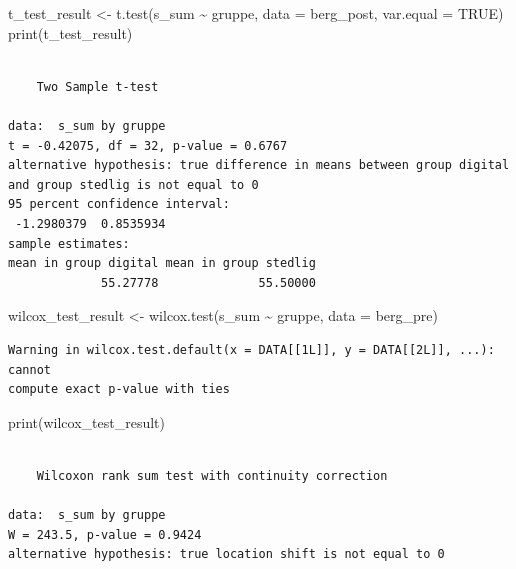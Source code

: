 \documentclass[
  letterpaper,
  DIV=11,
  numbers=noendperiod]{scrreprt}
\newenvironment{Shaded}{\begin{snugshade}}{\end{snugshade}}
\newcommand{\AttributeTok}[1]{\textcolor[rgb]{0.40,0.45,0.13}{#1}}
\newcommand{\ConstantTok}[1]{\textcolor[rgb]{0.56,0.35,0.01}{#1}}
\newcommand{\FunctionTok}[1]{\textcolor[rgb]{0.28,0.35,0.67}{#1}}
\newcommand{\NormalTok}[1]{\textcolor[rgb]{0.00,0.23,0.31}{#1}}
\newcommand{\OtherTok}[1]{\textcolor[rgb]{0.00,0.23,0.31}{#1}}
\newcommand{\SpecialCharTok}[1]{\textcolor[rgb]{0.37,0.37,0.37}{#1}}
\begin{document}
\begin{Shaded}
\begin{Highlighting}[]
\NormalTok{t\_test\_result }\OtherTok{\textless{}{-}} \FunctionTok{t.test}\NormalTok{(s\_sum }\SpecialCharTok{\textasciitilde{}}\NormalTok{ gruppe, }\AttributeTok{data =}\NormalTok{ berg\_post, }\AttributeTok{var.equal =} \ConstantTok{TRUE}\NormalTok{) }
\FunctionTok{print}\NormalTok{(t\_test\_result)}
\end{Highlighting}
\end{Shaded}

\begin{verbatim}

    Two Sample t-test

data:  s_sum by gruppe
t = -0.42075, df = 32, p-value = 0.6767
alternative hypothesis: true difference in means between group digital and group stedlig is not equal to 0
95 percent confidence interval:
 -1.2980379  0.8535934
sample estimates:
mean in group digital mean in group stedlig 
             55.27778              55.50000 
\end{verbatim}

\begin{Shaded}
\begin{Highlighting}[]
\NormalTok{wilcox\_test\_result }\OtherTok{\textless{}{-}} \FunctionTok{wilcox.test}\NormalTok{(s\_sum }\SpecialCharTok{\textasciitilde{}}\NormalTok{ gruppe, }\AttributeTok{data =}\NormalTok{ berg\_pre)}
\end{Highlighting}
\end{Shaded}

\begin{verbatim}
Warning in wilcox.test.default(x = DATA[[1L]], y = DATA[[2L]], ...): cannot
compute exact p-value with ties
\end{verbatim}

\begin{Shaded}
\begin{Highlighting}[]
\FunctionTok{print}\NormalTok{(wilcox\_test\_result)}
\end{Highlighting}
\end{Shaded}

\begin{verbatim}

    Wilcoxon rank sum test with continuity correction

data:  s_sum by gruppe
W = 243.5, p-value = 0.9424
alternative hypothesis: true location shift is not equal to 0
\end{verbatim}
\end{document}

